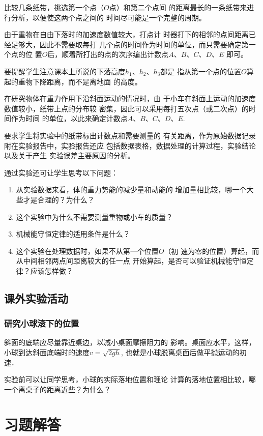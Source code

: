 比较几条纸带，挑选第一个点（$O$点）和第二个点间
的距离最长的一条纸带来进行分析，以便使这两个点之间的
时间尽可能是一个完整的周期。

由于重物在自由下落时的加速度数值较大，打点计
时器打下的相邻的点间距离已经足够大，因此不需要取每打
几个点的时间作为时间的单位，而只需要确定第一个点的位
置$O$后，顺着所打出的点的次序编出计数点$A$、$B$、$C$、$D$、$E$
即可。

要提醒学生注意课本上所说的下落高度$h_1$、$h_2$、$h_3$都是
指从第一个点的位置$O$算起的重物下降距离，而不是离地面
的高度。

在研究物体在重力作用下沿斜面运动的情况时，由
于小车在斜面上运动的加速度数值较小，纸带上点的分布较
密集，因此可以采用每打五次点（或二次点）的时间作为时间
的单位，以此来确定计数点$A$、$B$、$C$、$D$、$E$.

要求学生将实验中的纸带标出计数点和需要测量的
有关距离，作为原始数据记录附在实验报告中，实验报告还应
包括数据表格，数据处理的计算过程，实验结论以及关于产生
实验误差主要原因的分析。

通过实验还可让学生思考以下问题：
\begin{enumerate}
\item 从实验数据来看，体的重力势能的减少量和动能的
增加量相比较，哪一个大些才是合理的？为什么？
\item 这个实验中为什么不需要测量重物或小车的质量？
\item 机械能守恒定律的适用条件是什么？
\item 这个实验在处理数据时，如果不从第一个位置$O$（初
速为零的位置）算起，而从中间相邻两点间距离较大的任一点
开始算起，是否可以验证机械能守恒定律？应该怎样做？
\end{enumerate}

\subsection{课外实验活动}
\subsubsection{研究小球滚下的位置}
斜面的底端应尽量靠近桌边，以减小桌面摩擦阻力的
影响。桌面应水平，这样，小球到达斜面底端时的速度$v
=\sqrt{2gh}$, 也就是小球脱离桌面后做平抛运动的初速．

实验前可以让同学思考，小球的实际落地位置和理论
计算的落地位置相比较，哪一个离桌子的距离近些？为什么？


\section{习题解答}
